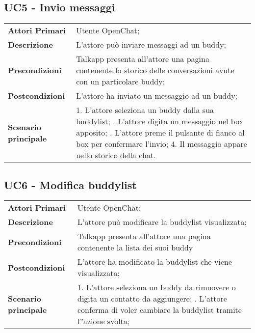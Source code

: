 
\subsection{UC5 - Invio messaggi}
	\begin{center}
	\bgroup
	\def\arraystretch{1.8}     
	\begin{longtable}{  p{4cm} | p{9.5cm} } 
		\textbf{Attori Primari} & Utente OpenChat; \\ 
		\textbf{Descrizione} &  L'attore può inviare messaggi ad un buddy; \\ 
		\textbf{Precondizioni}  & Talkapp presenta all'attore una pagina contenente lo storico delle conversazioni avute con un particolare buddy; \\
		\textbf{Postcondizioni} & L'attore ha inviato un messaggio ad un buddy; \\ 
		\textbf{Scenario principale} & 
		1. L'attore seleziona un buddy dalla sua buddylist; \newline
		2. L'attore digita un messaggio nel box apposito; \newline
		3. L'attore preme il pulsante di fianco al box per confermare l'invio;
		4. Il messaggio appare nello storico della chat.
	\end{longtable}
	\egroup
\end{center}

\subsection{UC6 - Modifica buddylist}
	\begin{center}
	\bgroup
	\def\arraystretch{1.8}     
	\begin{longtable}{  p{4cm} | p{9.5cm} } 
		\textbf{Attori Primari} & Utente OpenChat; \\ 
		\textbf{Descrizione} &  L'attore può modificare la buddylist visualizzata; \\ 
		\textbf{Precondizioni}  & Talkapp presenta all'attore una pagina contenente la lista dei suoi buddy \\
		\textbf{Postcondizioni} & L'attore ha modificato la buddylist che viene visualizzata; \\ 
		\textbf{Scenario principale} & 
		1. L'attore seleziona un buddy da rimuovere o digita un contatto da aggiungere; \newline
		2. L'attore conferma di voler cambiare la buddylist tramite l''azione svolta;
	\end{longtable}
	\egroup
\end{center}

